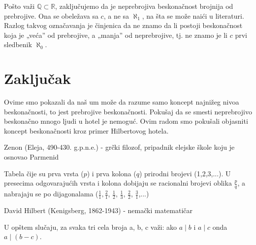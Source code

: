 \documentclass[a4paper]{article}
\begin{document}
Pošto važi $\mathbb{Q}\subset \mathbb{R}$, zaključujemo da je neprebrojiva beskonačnost brojnija od prebrojive. Ona se obeležava sa $c$, a ne sa $\aleph_{1}$, na šta se može naići u literaturi. Razlog takvog označavanja je činjenica da ne znamo da li postoji beskonačnost koja je „veća” od prebrojive, a „manja” od neprebrojive, tj. ne znamo je li $c$ prvi sledbenik $\aleph_{0}$.\\

\section{Zaključak}
\label{poglavlje:Zaključak}
Ovime smo pokazali da naš um može da razume samo koncept najnižeg nivoa beskonačnosti, to jest prebrojive beskonačnosti.
Pokušaj da se smesti neprebrojivo beskonačno mnogo ljudi u hotel je nemoguć. Ovim radom smo pokušali objasniti koncept beskonačnosti kroz primer Hilbertovog hotela.

\renewcommand{\refname}{Dodatak: objašnjenja}
\begin{thebibliography}{9}

 Zenon (Eleja, 490-430. g.p.n.e.) - grčki filozof, pripadnik elejske škole koju je osnovao Parmenid

 Tabela čije su prva vrsta ($p$) i prva kolona ($q$) prirodni brojevi (1,2,3,...). U presecima odgovarajućih vrsta i kolona dobijaju se racionalni brojevi oblika $\frac{p}{q}$, a nabrajaju se po dijagonalama ($\frac{1}{1}, \frac{2}{1}$, $\frac{1}{2}$, $\frac{1}{3}$, $\frac{2}{2}$, $\frac{3}{1}$,...)

 David Hilbert (Kenigsberg, 1862-1943) - nemački matematičar

U opštem slučaju, za svaka tri cela broja a, b, c važi: ako $a \mid b$ i $a \mid c$ onda $a \mid (b - c)$.




\end{thebibliography}
\renewcommand{\refname}{Literatura}


\end{document}
